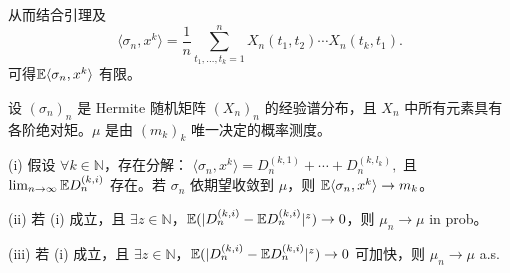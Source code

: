 从而结合引理及
\[
\langle \sigma_n, x^k \rangle = \frac{1}{n} \sum_{t_1, \ldots, t_k=1}^{n} X_n(t_1, t_2) \cdots X_n(t_k, t_1).
\]
可得$\mathbb{E} \langle \sigma_n, x^k \rangle$ 有限。

\begin{theorem}
设 $(\sigma_n)_n$ 是 Hermite 随机矩阵 $(X_n)_n$ 的经验谱分布，且 $X_n$ 中所有元素具有各阶绝对矩。$\mu$ 是由 $(m_k)_k$ 唯一决定的概率测度。

(i) 假设 $\forall k \in \mathbb{N}$，存在分解：
\(
\langle \sigma_n, x^k \rangle = D_n^{(k,1)} + \cdots + D_n^{(k,l_k)},
\)
且 $\lim_{n \to \infty} \mathbb{E} D_n^{(k,i)}$ 存在。若 $\sigma_n$ 依期望收敛到 $\mu$，则 $\mathbb{E} \langle \sigma_n, x^k \rangle \to m_k$。

(ii) 若 (i) 成立，且 $\exists z \in \mathbb{N}$，$\mathbb{E}(|D_n^{(k,i)} - \mathbb{E} D_n^{(k,i)}|^z) \to 0$，则 $\mu_n \to \mu$ in prob。

(iii) 若 (i) 成立，且 $\exists z \in \mathbb{N}$，$\mathbb{E}(|D_n^{(k,i)} - \mathbb{E} D_n^{(k,i)}|^z) \to 0$ 可加快，则 $\mu_n \to \mu$ a.s.
\end{theorem}